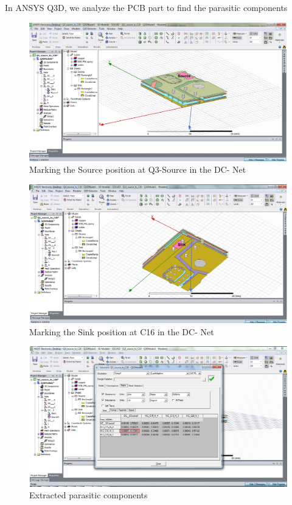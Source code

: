 In ANSYS Q3D, we analyze the PCB part to find the parasitic components

\begin{figure} [H]
  \centering
  \includegraphics[width=\linewidth]{pictures/examples/Q3S_C16_Source.png}
  \caption{Marking the Source position at Q3-Source in the DC- Net}
  \label{fig:Q3s_C16_source}
\end{figure}

\begin{figure} [H]
  \centering
  \includegraphics[width=\linewidth]{pictures/examples/Q3S_C16_Sink.png}
  \caption{Marking the Sink position at C16 in the DC- Net}
  \label{fig:Q3s_C16_sink}
\end{figure}

\begin{figure} [H]
  \centering
  \includegraphics[width=\linewidth]{pictures/examples/Q3S_C16_extractions.png}
  \caption{Extracted parasitic components}
  \label{fig:Q33_C16_extractions}
\end{figure}

